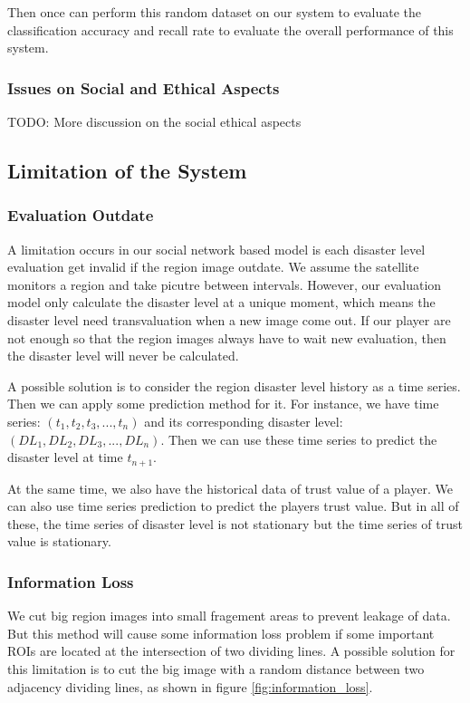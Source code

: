   Then once can perform this random dataset on our system to evaluate the classification accuracy and recall rate to
  evaluate the overall performance of this system.

  \subsubsection{Issues on Social and Ethical Aspects}

  TODO: More discussion on the social ethical aspects

\subsection{Limitation of the System}

  \subsubsection{Evaluation Outdate}

  A limitation occurs in our social network based model is each disaster level evaluation get invalid 
  if the region image outdate. 
  We assume the satellite monitors a region and take picutre between intervals. However, our evaluation
  model only calculate the disaster level at a unique moment, which means the disaster level need 
  transvaluation when a new image come out.
  If our player are not enough so that the region images always have to wait new evaluation, then the
  disaster level will never be calculated.

  A possible solution is to consider the region disaster level history as a time series. Then we can apply
  some prediction method for it. For instance, we have time series: $(t_1, t_2, t_3, ..., t_n)$
  and its corresponding disaster level: $(DL_1, DL_2, DL_3, ..., DL_n)$.
  Then we can use these time series to predict the disaster level at time $t_{n+1}$.

  At the same time, we also have the historical data of trust value of a player. We can also
  use time series prediction to predict the players trust value. But in all of these, the time series
  of disaster level is not stationary but the time series of trust value is stationary.

  \subsubsection{Information Loss}
  We cut big region images into small fragement areas to prevent leakage of data. 
  But this method will cause some information loss problem if some important ROIs are 
  located at the intersection of two dividing lines.
  A possible solution for this limitation is to cut the big image with a random distance 
  between two adjacency dividing lines, as shown in figure \ref{fig:information_loss}.


